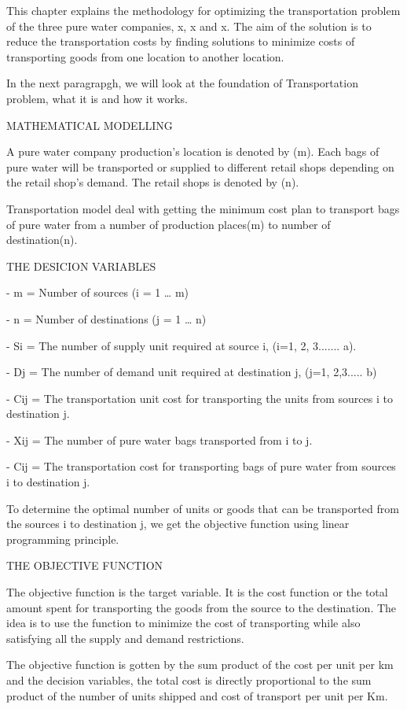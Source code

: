 \documentclass{article}
\begin{document}
{\large This chapter explains the methodology for optimizing the transportation problem of the three pure water companies, x, x and x.
The aim of the solution is to reduce the transportation costs by finding solutions to minimize costs of transporting goods from one location to another location.

In the next paragrapgh, we will look at the foundation of Transportation problem, what it is and how it works.

MATHEMATICAL MODELLING

A pure water company production's location is denoted by (m). Each bags of pure water will be transported or supplied to different retail shops depending on the retail shop's demand. The retail shops is denoted by (n).

Transportation model deal with getting the minimum cost plan to transport bags of pure water from a number of production places(m) to number of destination(n). \break

THE DESICION VARIABLES

- m = Number of sources (i = 1 … m)

- n = Number of destinations (j = 1 … n)

- Si = The number of supply unit required at source i, (i=1, 2, 3....... a).

- Dj = The number of demand unit required at destination j, (j=1, 2,3..... b)

- Cij = The transportation unit cost for transporting the units from sources i to destination j.

- Xij = The number of pure water bags transported from i to j.

- Cij = The transportation cost for transporting bags of pure water from sources i to destination j.

To determine the optimal number of units or goods that can be transported from the sources i to destination j, we get the objective function using linear programming principle. \break

THE OBJECTIVE FUNCTION

The objective function is the target variable. It is the cost function or the total amount spent for transporting the goods from the source to the destination. The idea is to use the function to minimize the cost of transporting while also satisfying all the supply and demand restrictions.

The objective function is gotten by the sum product of the cost per unit per km and the decision variables, the total cost is directly proportional to the sum product of the number of units shipped and cost of transport per unit per Km.

}
\end{document}
